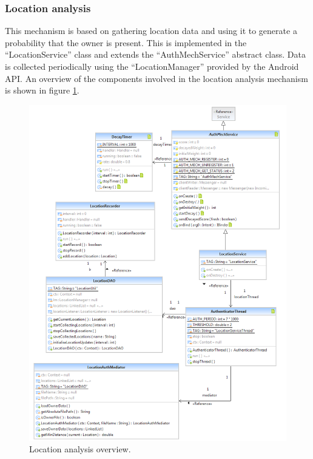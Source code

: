 \subsubsection{Location analysis}
This mechanism is based on gathering location data and using it to generate a probability that the owner is present. This is implemented in the ``LocationService'' class and extends the ``AuthMechService'' abstract class. Data is collected periodically using the ``LocationManager'' provided by the Android API. An overview of the components involved in the location analysis mechanism is shown in figure \ref{fig:location}.
\begin{figure}[h]
    \centering
    \includegraphics[width=\textwidth]{Pictures/location}
    \caption{Location analysis overview.}
    \label{fig:location}
\end{figure}

